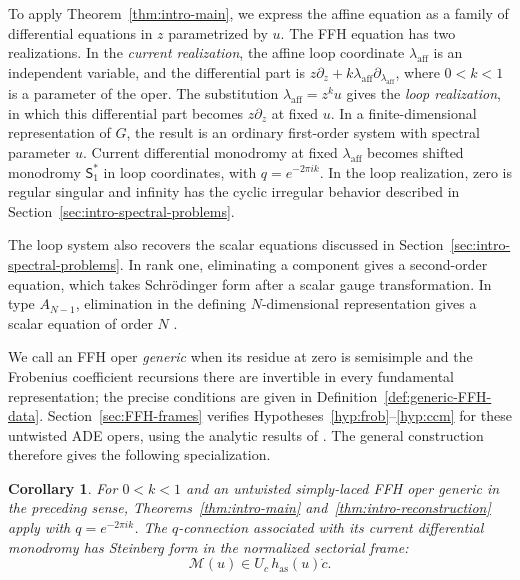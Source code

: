 \documentclass[11pt,leqno]{amsart}
\numberwithin{equation}{section}
\theoremstyle{plain}
\newtheorem{corollary}[theorem]{Corollary}
\theoremstyle{definition}
\theoremstyle{plain}
\theoremstyle{definition}
\theoremstyle{remark}
\begin{document}
To apply Theorem~\ref{thm:intro-main}, we express the affine equation as a family of differential equations in $z$ parametrized by $u$.  The FFH equation has two realizations.  In the \emph{current realization}, the affine loop coordinate $\lambda_{\mathrm{aff}}$ is an independent variable, and the differential part is $z\partial_z+k\lambda_{\mathrm{aff}}\partial_{\lambda_{\mathrm{aff}}}$, where $0<k<1$ is a parameter of the oper.  The substitution $\lambda_{\mathrm{aff}}=z^ku$ gives the \emph{loop realization}, in which this differential part becomes $z\partial_z$ at fixed $u$.  In a finite-dimensional representation of $G$, the result is an ordinary first-order system with spectral parameter $u$.  Current differential monodromy at fixed $\lambda_{\mathrm{aff}}$ becomes shifted monodromy $\mathsf S_1^*$ in loop coordinates, with $q=e^{-2\pi ik}$.  In the loop realization, zero is regular singular and infinity has the cyclic irregular behavior described in Section~\ref{sec:intro-spectral-problems}.

The loop system also recovers the scalar equations discussed in Section~\ref{sec:intro-spectral-problems}.  In rank one, eliminating a component gives a second-order equation, which takes Schr\"odinger form after a scalar gauge transformation.  In type $A_{N-1}$, elimination in the defining $N$-dimensional representation gives a scalar equation of order $N$ \cite{FeiginFrenkel2011}.

We call an FFH oper \emph{generic} when its residue at zero is semisimple and the Frobenius coefficient recursions there are invertible in every fundamental representation; the precise conditions are given in Definition~\ref{def:generic-FFH-data}.  Section~\ref{sec:FFH-frames} verifies Hypotheses~\ref{hyp:frob}--\ref{hyp:ccm} for these untwisted ADE opers, using the analytic results of \cite{MRV2016,MRhigher2020,MR2024,CGM2025}.  The general construction therefore gives the following specialization.

\begin{corollary}\label{cor:intro-FFH-specialization}
For $0<k<1$ and an untwisted simply-laced FFH oper generic in the preceding sense, Theorems~\ref{thm:intro-main} and~\ref{thm:intro-reconstruction} apply with $q=e^{-2\pi ik}$. The $q$-connection associated with its current differential monodromy has Steinberg form in the normalized sectorial frame:
\[
 \mathscr M(u)\in U_c\,h_{\mathrm{as}}(u)\dot c.
\]
\end{corollary}
\end{document}
